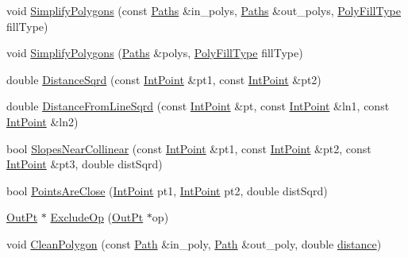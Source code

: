 \begin{DoxyCompactItemize}
\item 
void \mbox{\hyperlink{namespace_clipper_lib_ac9ebbe437e4c08816bffeced6d001cf6}{Simplify\+Polygons}} (const \mbox{\hyperlink{namespace_clipper_lib_a4bab1d9e10805fa6f1fd3b78c56efcfe}{Paths}} \&in\+\_\+polys, \mbox{\hyperlink{namespace_clipper_lib_a4bab1d9e10805fa6f1fd3b78c56efcfe}{Paths}} \&out\+\_\+polys, \mbox{\hyperlink{namespace_clipper_lib_a95a41ff8fa6b351d304829c267d638d7}{Poly\+Fill\+Type}} fill\+Type)
\item 
void \mbox{\hyperlink{namespace_clipper_lib_ac43b677f95d30bd595bbdd5eb79cdcec}{Simplify\+Polygons}} (\mbox{\hyperlink{namespace_clipper_lib_a4bab1d9e10805fa6f1fd3b78c56efcfe}{Paths}} \&polys, \mbox{\hyperlink{namespace_clipper_lib_a95a41ff8fa6b351d304829c267d638d7}{Poly\+Fill\+Type}} fill\+Type)
\item 
double \mbox{\hyperlink{namespace_clipper_lib_ab3ea29b9e123ab56ede03ce6946c9e7d}{Distance\+Sqrd}} (const \mbox{\hyperlink{struct_clipper_lib_1_1_int_point}{Int\+Point}} \&pt1, const \mbox{\hyperlink{struct_clipper_lib_1_1_int_point}{Int\+Point}} \&pt2)
\item 
double \mbox{\hyperlink{namespace_clipper_lib_ac57923512d57903663fed9778585ca18}{Distance\+From\+Line\+Sqrd}} (const \mbox{\hyperlink{struct_clipper_lib_1_1_int_point}{Int\+Point}} \&pt, const \mbox{\hyperlink{struct_clipper_lib_1_1_int_point}{Int\+Point}} \&ln1, const \mbox{\hyperlink{struct_clipper_lib_1_1_int_point}{Int\+Point}} \&ln2)
\item 
bool \mbox{\hyperlink{namespace_clipper_lib_a6a8d461810e4bcb5c67bf8e3026839b6}{Slopes\+Near\+Collinear}} (const \mbox{\hyperlink{struct_clipper_lib_1_1_int_point}{Int\+Point}} \&pt1, const \mbox{\hyperlink{struct_clipper_lib_1_1_int_point}{Int\+Point}} \&pt2, const \mbox{\hyperlink{struct_clipper_lib_1_1_int_point}{Int\+Point}} \&pt3, double dist\+Sqrd)
\item 
bool \mbox{\hyperlink{namespace_clipper_lib_a52757887bc031d0052ae95dccb83cd2c}{Points\+Are\+Close}} (\mbox{\hyperlink{struct_clipper_lib_1_1_int_point}{Int\+Point}} pt1, \mbox{\hyperlink{struct_clipper_lib_1_1_int_point}{Int\+Point}} pt2, double dist\+Sqrd)
\item 
\mbox{\hyperlink{struct_clipper_lib_1_1_out_pt}{Out\+Pt}} $\ast$ \mbox{\hyperlink{namespace_clipper_lib_a5d4e245ecf47a87cf3c88876f55ab3a3}{Exclude\+Op}} (\mbox{\hyperlink{struct_clipper_lib_1_1_out_pt}{Out\+Pt}} $\ast$op)
\item 
void \mbox{\hyperlink{namespace_clipper_lib_a9246a3146ac112581e82be58e158be7b}{Clean\+Polygon}} (const \mbox{\hyperlink{namespace_clipper_lib_af39c8fe00f278f18cc8142fef41242da}{Path}} \&in\+\_\+poly, \mbox{\hyperlink{namespace_clipper_lib_af39c8fe00f278f18cc8142fef41242da}{Path}} \&out\+\_\+poly, double \mbox{\hyperlink{unwrapping_8cc_abf82b59ef33c7549580276e00ae85d18}{distance}})

\end{DoxyCompactItemize}
